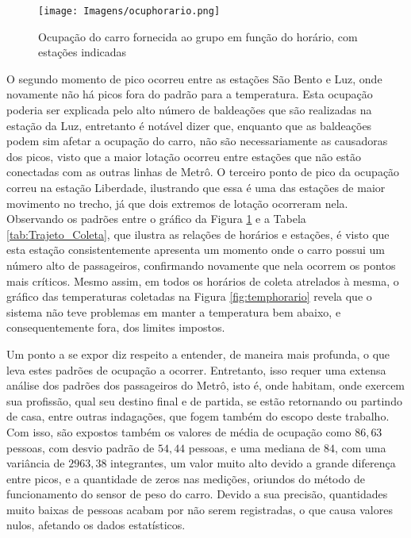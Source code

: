 \documentclass[acronym,symbols,table]{fei}
\begin{document}
\begin{figure}[!htb]
    \centering
    \caption{Ocupação do carro fornecida ao grupo em função do horário, com estações indicadas}
    \texttt{[image: Imagens/ocuphorario.png]}
    \label{fig:ocuphorario}
\end{figure}
\newpage
O segundo momento de pico ocorreu entre as estações São Bento e Luz, onde novamente não há picos fora do padrão para a temperatura. Esta ocupação poderia ser explicada pelo alto número de baldeações que são realizadas na estação da Luz, entretanto é notável dizer que, enquanto que as baldeações podem sim afetar a ocupação do carro, não são necessariamente as causadoras dos picos, visto que a maior lotação ocorreu entre estações que não estão conectadas com as outras linhas de Metrô. O terceiro ponto de pico da ocupação correu na estação Liberdade, ilustrando que essa é uma das estações de maior movimento no trecho, já que dois extremos de lotação ocorreram nela. Observando os padrões entre o gráfico da Figura \ref{fig:ocuphorario} e a Tabela \ref{tab:Trajeto_Coleta}, que ilustra as relações de horários e estações, é visto que esta estação consistentemente apresenta um momento onde o carro possui um número alto de passageiros, confirmando novamente que nela ocorrem os pontos mais críticos. Mesmo assim, em todos os horários de coleta atrelados à mesma, o gráfico das temperaturas coletadas na Figura \ref{fig:temphorario} revela que o sistema não teve problemas em manter a temperatura bem abaixo, e consequentemente fora, dos limites impostos.

Um ponto a se expor diz respeito a entender, de maneira mais profunda, o que leva estes padrões de ocupação a ocorrer. Entretanto, isso requer uma extensa análise dos padrões dos passageiros do Metrô, isto é, onde habitam, onde exercem sua profissão, qual seu destino final e de partida, se estão retornando ou partindo de casa, entre outras indagações, que fogem também do escopo deste trabalho. Com isso, são expostos também os valores de média de ocupação como $86,63$ pessoas, com desvio padrão de $54,44$ pessoas, e uma mediana de $84$, com uma variância de $2963,38$ integrantes, um valor muito alto devido a grande diferença entre picos, e a quantidade de zeros nas medições, oriundos do método de funcionamento do sensor de peso do carro. Devido a sua precisão, quantidades muito baixas de pessoas acabam por não serem registradas, o que causa valores nulos, afetando os dados estatísticos.
\end{document}
